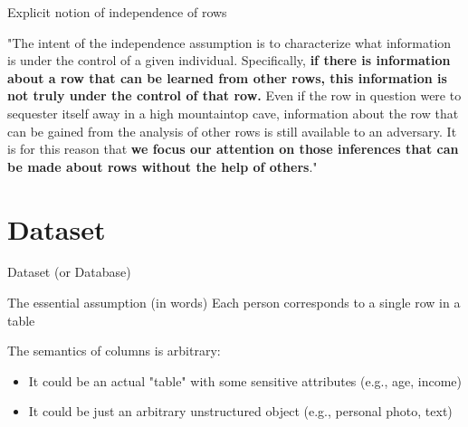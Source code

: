 \documentclass[12pt,aspectratio=169,handout]{beamer}
\begin{document}
\begin{frame}{Explicit notion of independence of rows}


"The intent of the independence assumption is to characterize what information is under the control of a given individual. Specifically, \textbf{if there is information about a row that can be learned from other rows, this information is not truly under the control of that row.} Even if the row in question were to sequester itself away in a high mountaintop cave, information about the row that can be gained from the analysis of other rows is still available to an adversary. It is for this reason that \textbf{we focus our attention on those inferences that can be made about rows without the help of others}."


\end{frame}

\section{Dataset}

\begin{frame}{Dataset (or Database)}

\begin{block}{The essential assumption (in words)}
Each person corresponds to a single row in a table
\end{block}

The semantics of columns is arbitrary:

\begin{itemize}
\item It could be an actual "table" with some sensitive attributes (e.g., age, income)
\item It could be just an arbitrary unstructured object (e.g., personal photo, text)
\end{itemize}

\end{frame}
\end{document}
